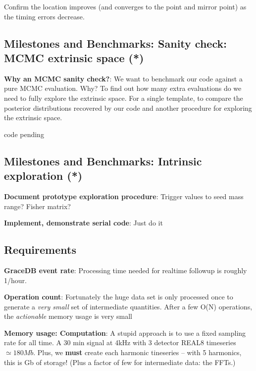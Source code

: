 \documentclass[twocolumn,prd,nofootinbib]{revtex4}
\newcommand\editremark[1]{{\color{red} #1}}
\begin{document}
\begin{widetext}
\begin{itemize}
 Confirm the location improves (and  converges to the point and mirror point) as the timing errors decrease.
\end{itemize}

\subsection{Milestones and Benchmarks: Sanity check: MCMC extrinsic space (*)}

\noindent \textbf{Why an MCMC  sanity check?}: We want to benchmark our code against a pure MCMC evaluation. Why?  To
find out how many
extra evaluations do we need to fully explore the extrinsic space.  For a single template, to compare the posterior distributions recovered by
our code and another procedure for exploring the extrinsic space.


\editremark{code pending}


\subsection{Milestones and Benchmarks:  Intrinsic exploration (*)}

\noindent \textbf{Document prototype exploration procedure}: Trigger values to seed mass range? Fisher matrix?


\noindent \textbf{Implement, demonstrate serial code}: Just do it





\end{widetext}
\subsection{Requirements}

\noindent \textbf{GraceDB event rate}: Processing time needed for realtime followup is roughly 1/hour.

\noindent \textbf{Operation count}: Fortunately the huge data set is only processed once to generate a \emph{very small}
set of intermediate quantities.  After a few O(N) operations, the \emph{actionable} memory usage is very small


\noindent \textbf{Memory usage: Computation}: A stupid approach is to use a fixed sampling rate for all time.
%
A 30 min signal at 4kHz with 3 detector REAL8 timeseries $\simeq 180 Mb$.
Plus, we \textbf{must} create each harmonic tineseries -- with 5 harmonics, this is Gb of storage!  (Plus a factor of few for intermediate
data: the FFTs.)
\end{document}
